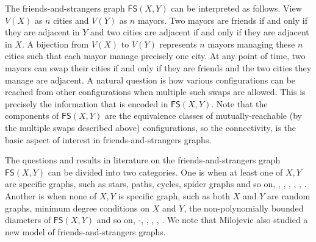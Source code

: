 \documentclass[11pt]{article}
\newcommand{\FS}{\mathsf{FS}}
\begin{document}
The friends-and-strangers graph $\mathsf{FS}(X,Y)$ can be interpreted as follows.  View $V(X)$ as $n$ cities and $V(Y)$ as $n$ mayors.  Two mayors are friends if and only if they are adjacent in $Y$ and two cities are adjacent if and only if they are adjacent in $X$. A bijection from $V(X)$ to $V(Y)$ represents $n$ mayors managing these $n$ cities such that each mayor manage precisely one city.
 At any point of time, two mayors can swap their cities if and only if they are friends and the two cities they manage are adjacent. A natural question is  how various configurations can be reached from other configurations when  multiple such swaps are allowed. This is precisely the information that is encoded in $\mathsf{FS}(X,Y)$. Note that the components of $\mathsf{FS}(X,Y)$ are the equivalence classes of mutually-reachable (by the multiple swaps described above) configurations, so the connectivity,  is the basic aspect  of interest in  friends-and-strangers graphs. 





The questions and results in literature on the friends-and-strangers graph $\mathsf{FS}(X,Y)$ can be divided into two categories. One is when at least one of $X,Y$ are specific graphs, such as  stars, paths, cycles,  spider graphs and so on, \cite{DDLW}, \cite{DK}, \cite{J1}, \cite{L}, \cite{WC}, \cite{W}.  
 Another is when none of $X,Y$ is specific graph, such as both $X$ and $Y$ are random graphs, minimum degree conditions on $X$ and $Y$, the non-polynomially bounded diameters of $\FS(X,Y)$ and so on,  \cite{ADK}-\cite{DK}, \cite{J1}, \cite{J2}, \cite{M}, \cite{Wang}. 
 We  note that Milojevic \cite{M} also studied a new model of friends-and-strangers graphs.
 
\end{document}
